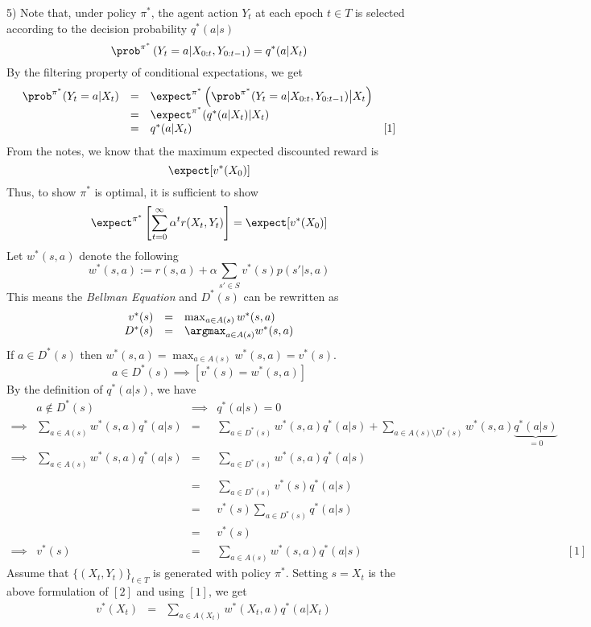 \documentclass[11pt,a4paper]{article}
\begin{document}
\begin{answer}{5)}
  Note that, under policy $\pi^*$, the agent action $Y_t$ at each epoch $t\in T$ is selected according to the decision probability $q^*(a|s)$
  \[ \prob^{\pi^*}\left(Y_t=a|X_{0:t},Y_{0:t-1}\right)=q^*(a|X_t) \]
  By the filtering property of conditional expectations, we get
  \[\begin{array}{rcll}
    \prob^{\pi^*}(Y_t=a|X_t)&=&\expect^{\pi^*}\left(\prob^{\pi^*}(Y_t=a|X_{0:t},Y_{0:t-1})\big|X_t\right)\\
    &=&\expect^{\pi^*}(q^*(a|X_t)|X_t)\\
    &=&q^*(a|X_t)&[1]
  \end{array}\]
  From the notes, we know that the maximum expected discounted reward is
  \[ \expect[v^*(X_0)] \]
  Thus, to show $\pi^*$ is optimal, it is sufficient to show
  \[ \expect^{\pi^*}\left[\sum_{t=0}^\infty\alpha^tr(X_t,Y_t)\right]=\expect[v^*(X_0)] \]
  Let $w^*(s,a)$ denote the following
  \[ w^*(s,a):=r(s,a)+\alpha\sum_{s'\in S}v^*(s)p(s'|s,a) \]
  This means the \textit{Bellman Equation} and $D^*(s)$ can be rewritten as
  \[\begin{array}{rcl}
    v^*(s)&=&\max_{a\in A(s)}w^*(s,a)\\
    D^*(s)&=&\argmax_{a\in A(s)}w^*(s,a)
  \end{array}\]
  If $a\in D^*(s)$ then $w^*(s,a)=\max_{a\in A(s)}w^*(s,a)=v^*(s)$.
  \[ a\in D^*(s)\implies [v^*(s)=w^*(s,a)] \]
  By the definition of $q^*(a|s)$, we have
  \[\begin{array}{rrcll}
    &a\not\in D^*(s)&\implies&q^*(a|s)=0\\
    \implies&\sum_{a\in A(s)}w^*(s,a)q^*(a|s)&=&\sum_{a\in D^*(s)}w^*(s,a)q^*(a|s)+\sum_{a\in A(s)\setminus D^*(s)}w^*(s,a)\underbrace{q^*(a|s)}_{=0}\\
    \implies&\sum_{a\in A(s)}w^*(s,a)q^*(a|s)&=&\sum_{a\in D^*(s)}w^*(s,a)q^*(a|s)\\\\
    &&=&\sum_{a\in D^*(s)}v^*(s)q^*(a|s)\\
    &&=&v^*(s)\sum_{a\in D^*(s)}q^*(a|s)\\
    &&=&v^*(s)\\
    \implies&v^*(s)&=&\sum_{a\in A(s)}w^*(s,a)q^*(a|s)&[1]
  \end{array}\]
  Assume that $\{(X_t,Y_t)\}_{t\in T}$ is generated with policy $\pi^*$. Setting $s=X_t$ is the above formulation of $[2]$ and using $[1]$, we get
  \[\begin{array}{rrcl}
    &v^*(X_t)&=&\sum_{a\in A(X_t)}w^*(X_t,a)q^*(a|X_t)\\

\end{array}\]
\end{answer}
\end{document}
